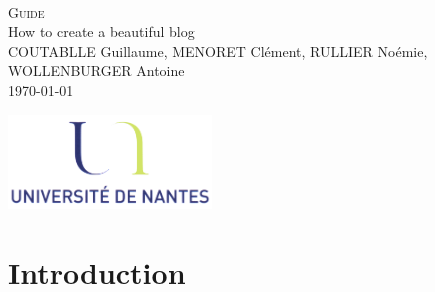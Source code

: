 \documentclass[a4paper,10pt]{article}
\begin{document}
\fancyhead[LE,CE,RE,LO,CO,RO]{}
\fancyfoot[LE,CE,RE,LO,CO,RO]{}
\renewcommand{\headrulewidth}{0.4pt}
\renewcommand{\footrulewidth}{0.4pt}

\begin{titlepage}

\vspace*{\fill}~
\begin{center}
{\large \textsc{Guide}} \\
\vspace{1cm}
{\LARGE How to create a beautiful blog} \\
\vspace{1cm}
COUTABLLE Guillaume, MENORET Clément, RULLIER Noémie, WOLLENBURGER Antoine \\
\today
\end{center}
\vspace*{\fill}

\begin{center}
\noindent 
\includegraphics[height=2.5cm]{Images/universite.png}
\end{center}
\pagebreak
\end{titlepage}

\newpage
\tableofcontents 

\newpage
\pagestyle{fancy}


\section{Introduction}
\end{document}
